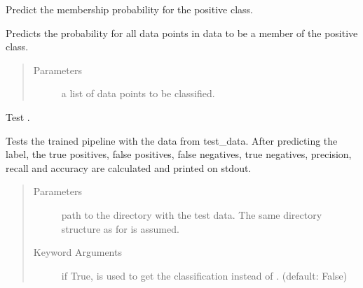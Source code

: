 \documentclass[letterpaper,10pt,english]{sphinxmanual}
\begin{document}
\begin{fulllineitems}
\begin{fulllineitems}
\end{fulllineitems}


\begin{fulllineitems}
\label{\detokenize{api:classifier.Classifier.predict_prob}}
Predict the membership probability for the positive class.

Predicts the probability for all data points in data to be a
member of the positive class.
\begin{quote}\begin{description}
\item[{Parameters}] \leavevmode
{} \textendash{} a list of data points to be classified.

\end{description}\end{quote}

\end{fulllineitems}


\begin{fulllineitems}
\label{\detokenize{api:classifier.Classifier.test}}
Test .

Tests the trained pipeline with the data from test\_data. After
predicting the label, the true positives, false positives,
false negatives, true negatives, precision, recall and
accuracy are calculated and printed on stdout.
\begin{quote}\begin{description}
\item[{Parameters}] \leavevmode
{} \textendash{} path to the directory with the test data. The
same directory structure as for {\hyperref[\detokenize{api:classifier.Classifier.train}]{}} is assumed.

\item[{Keyword Arguments}] \leavevmode
{} \textendash{} if True, {\hyperref[\detokenize{api:classifier.Classifier.predict_prob}]{}} is used to get the
classification instead of {\hyperref[\detokenize{api:classifier.Classifier.predict}]{}}. (default: False)


\end{description}
\end{quote}
\end{fulllineitems}
\end{fulllineitems}
\end{document}
